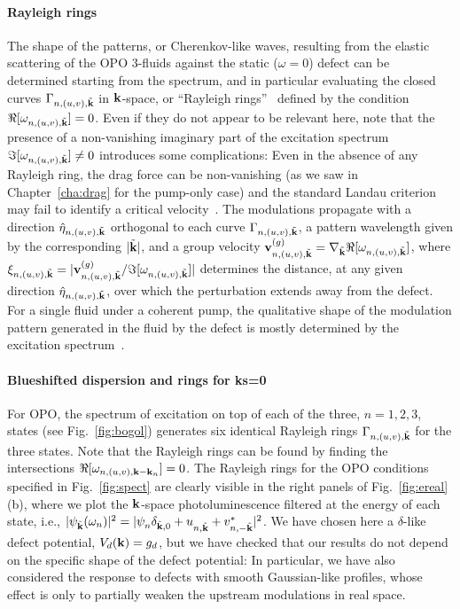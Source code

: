\paragraph{Rayleigh rings}
The shape of the patterns, or Cherenkov-like waves, resulting from the
elastic scattering of the OPO 3-fluids against the static ($\omega=0$)
defect can be determined starting from the spectrum, and in particular
evaluating the closed curves $\Gamma_{n,(u,v), \tilde{\mathbf{k}}}$ in
$\mathbf{k}$-space, or ``Rayleigh rings''~\cite{9783319002651} defined by
the condition $\Re[\omega_{n,(u,v), \tilde{\mathbf{k}}}] = 0$. Even if
they do not appear to be relevant here, note that the presence of a
non-vanishing imaginary part of the excitation spectrum
$\Im[\omega_{n,(u,v),\tilde{\mathbf{k}}}]\neq 0$ introduces some
complications: Even in the absence of any Rayleigh ring, the drag
force can be non-vanishing (as we saw in Chapter~\ref{cha:drag} for
the pump-only case) and the standard Landau criterion may fail to
identify a critical velocity~\cite{Wouters_2010}.
%
The modulations propagate with a direction
$\hat{\eta}_{n,(u,v),\tilde{\mathbf{k}}}$ orthogonal to each curve
$\Gamma_{n,(u,v), \tilde{\mathbf{k}}}$, a pattern wavelength given by
the corresponding $|\tilde{\mathbf{k}}|$, and a group velocity
$\mathbf{v}_{n,(u,v),\tilde{\mathbf{k}}}^{(g)}=\nabla_{\tilde{\mathbf{k}}}
\Re[\omega_{n,(u,v), \tilde{\mathbf{k}}}]$, where
$\xi_{n,(u,v),\tilde{\mathbf{k}}} =
|\mathbf{v}_{n,(u,v),\tilde{\mathbf{k}}}^{(g)} / \Im[\omega_{n,(u,v),
  \tilde{\mathbf{k}}}]|$ determines the distance, at any given direction
$\hat{\eta}_{n,(u,v),\tilde{\mathbf{k}}}$, over which the perturbation
extends away from the defect. For a single fluid under a coherent
pump, the qualitative shape of the modulation pattern generated in the
fluid by the defect is mostly determined by the excitation
spectrum~\cite{Carusotto_2006,Carusotto_2004}.



\paragraph{Blueshifted dispersion and rings for ks=0}
For OPO, the spectrum of excitation on top of each of the three,
$n=1,2,3$, states (see Fig.~\ref{fig:bogol}) generates six identical
Rayleigh rings $\Gamma_{n,(u,v), \tilde{\mathbf{k}}}$ for the three
states. Note that the Rayleigh rings can be found by finding the
intersections $\Re[\omega_{n,(u,v),\mathbf{k}-\mathbf{k}_n}]=0$.
%
The Rayleigh rings for the OPO conditions specified in
Fig.~\ref{fig:spect} are clearly visible in the right panels of
Fig.~\ref{fig:ereal} (b), where we plot the $\mathbf{k}$-space
photoluminescence filtered at the energy of each state, i.e.,
$|\psi_{\tilde{\mathbf{k}}} (\omega_n)|^2= |\psi_{n}^{}
\delta_{\tilde{\mathbf{k}},0} + u_{n,\tilde{\mathbf{k}}}^{} +
v^*_{n,-\tilde{\mathbf{k}}}|^2$.
%
We have chosen here a $\delta$-like defect potential,
$V_d(\mathbf{k}) = g_d$, but we have checked that our results do not
depend on the specific shape of the defect potential: In particular,
we have also considered the response to defects with smooth
Gaussian-like profiles, whose effect is only to partially weaken the
upstream modulations in real space.

